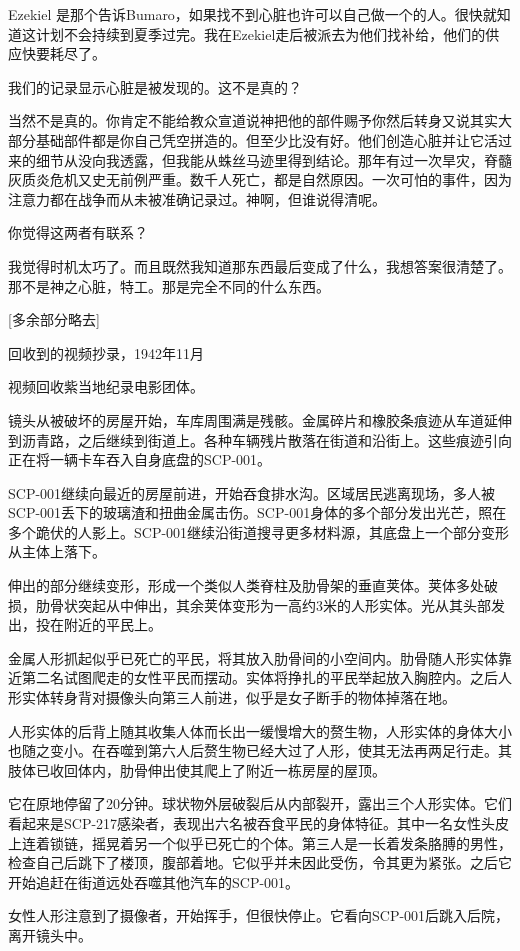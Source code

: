\begin{scpbox}
Ezekiel 是那个告诉Bumaro，如果找不到心脏也许可以自己做一个的人。很快就知道这计划不会持续到夏季过完。我在Ezekiel走后被派去为他们找补给，他们的供应快要耗尽了。

我们的记录显示心脏是被发现的。这不是真的？

当然不是真的。你肯定不能给教众宣道说神把他的部件赐予你然后转身又说其实大部分基础部件都是你自己凭空拼造的。但至少比没有好。他们创造心脏并让它活过来的细节从没向我透露，但我能从蛛丝马迹里得到结论。那年有过一次旱灾，脊髓灰质炎危机又史无前例严重。数千人死亡，都是自然原因。一次可怕的事件，因为注意力都在战争而从未被准确记录过。神啊，但谁说得清呢。

你觉得这两者有联系？

我觉得时机太巧了。而且既然我知道那东西最后变成了什么，我想答案很清楚了。那不是神之心脏，特工。那是完全不同的什么东西。

[多余部分略去]

\end{scpbox}

回收到的视频抄录，1942年11月

\begin{scpbox}

视频回收紫当地纪录电影团体。

镜头从被破坏的房屋开始，车库周围满是残骸。金属碎片和橡胶条痕迹从车道延伸到沥青路，之后继续到街道上。各种车辆残片散落在街道和沿街上。这些痕迹引向正在将一辆卡车吞入自身底盘的SCP-001。

SCP-001继续向最近的房屋前进，开始吞食排水沟。区域居民逃离现场，多人被SCP-001丢下的玻璃渣和扭曲金属击伤。SCP-001身体的多个部分发出光芒，照在多个跪伏的人影上。SCP-001继续沿街道搜寻更多材料源，其底盘上一个部分变形从主体上落下。

伸出的部分继续变形，形成一个类似人类脊柱及肋骨架的垂直荚体。荚体多处破损，肋骨状突起从中伸出，其余荚体变形为一高约3米的人形实体。光从其头部发出，投在附近的平民上。

金属人形抓起似乎已死亡的平民，将其放入肋骨间的小空间内。肋骨随人形实体靠近第二名试图爬走的女性平民而摆动。实体将挣扎的平民举起放入胸腔内。之后人形实体转身背对摄像头向第三人前进，似乎是女子断手的物体掉落在地。

人形实体的后背上随其收集人体而长出一缓慢增大的赘生物，人形实体的身体大小也随之变小。在吞噬到第六人后赘生物已经大过了人形，使其无法再两足行走。其肢体已收回体内，肋骨伸出使其爬上了附近一栋房屋的屋顶。

它在原地停留了20分钟。球状物外层破裂后从内部裂开，露出三个人形实体。它们看起来是SCP-217感染者，表现出六名被吞食平民的身体特征。其中一名女性头皮上连着锁链，摇晃着另一个似乎已死亡的个体。第三人是一长着发条胳膊的男性，检查自己后跳下了楼顶，腹部着地。它似乎并未因此受伤，令其更为紧张。之后它开始追赶在街道远处吞噬其他汽车的SCP-001。

女性人形注意到了摄像者，开始挥手，但很快停止。它看向SCP-001后跳入后院，离开镜头中。

\end{scpbox}

